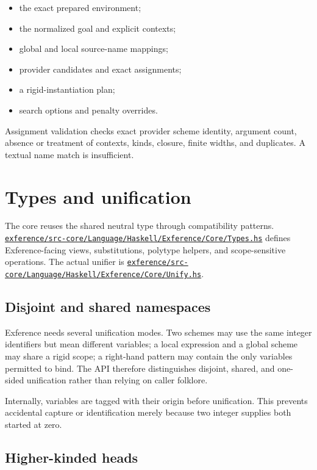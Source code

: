 \documentclass[10pt,letterpaper,oneside]{report}
\def\DjexBase{https://github.com/VladimirReshetnikov/Djex/blob/e454757d53ec057238c22fc6cd0d935b7d96b3dc/}
\newcommand{\dpath}[1]{\href{\DjexBase#1}{\nolinkurl{#1}}}
\begin{document}
\begin{itemize}
  \item the exact prepared environment;
  \item the normalized goal and explicit contexts;
  \item global and local source-name mappings;
  \item provider candidates and exact assignments;
  \item a rigid-instantiation plan;
  \item search options and penalty overrides.
\end{itemize}

Assignment validation checks exact provider scheme identity, argument count, absence or treatment of contexts, kinds, closure, finite widths, and duplicates. A textual name match is insufficient.

\section{Types and unification}\label{sec:exference-unify}

The core reuses the shared neutral type through compatibility patterns. \dpath{exference/src-core/Language/Haskell/Exference/Core/Types.hs} defines Exference-facing views, substitutions, polytype helpers, and scope-sensitive operations. The actual unifier is \dpath{exference/src-core/Language/Haskell/Exference/Core/Unify.hs}.

\subsection{Disjoint and shared namespaces}

Exference needs several unification modes. Two schemes may use the same integer identifiers but mean different variables; a local expression and a global scheme may share a rigid scope; a right-hand pattern may contain the only variables permitted to bind. The API therefore distinguishes disjoint, shared, and one-sided unification rather than relying on caller folklore.

Internally, variables are tagged with their origin before unification. This prevents accidental capture or identification merely because two integer supplies both started at zero.

\subsection{Higher-kinded heads}
\end{document}
